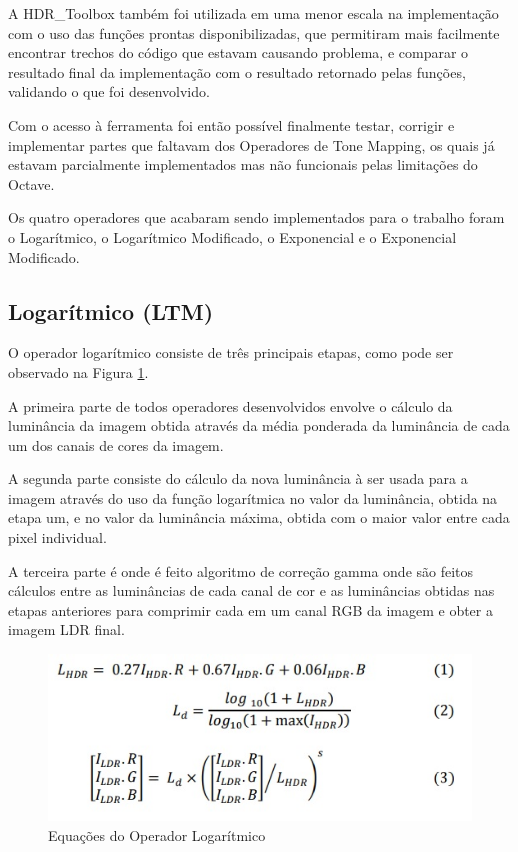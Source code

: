 \documentclass[conference]{IEEEtran}
\begin{document}
A HDR\_Toolbox também foi utilizada em uma menor escala na implementação com o uso das funções prontas disponibilizadas, que permitiram mais facilmente encontrar trechos do código que estavam causando problema, e comparar o resultado final da implementação com o resultado retornado pelas funções, validando o que foi desenvolvido.

Com o acesso à ferramenta foi então possível finalmente testar, corrigir e implementar partes que faltavam dos Operadores de Tone Mapping, os quais já estavam parcialmente implementados mas não funcionais pelas limitações do Octave.

Os quatro operadores que acabaram sendo implementados para o trabalho foram o Logarítmico, o Logarítmico Modificado, o Exponencial e o Exponencial Modificado.

\subsection{Logarítmico (LTM)}

O operador logarítmico consiste de três principais etapas, como pode ser observado na Figura \ref{LTM}.

A primeira parte de todos operadores desenvolvidos envolve o cálculo da luminância da imagem obtida através da média ponderada da luminância de cada um dos canais de cores da imagem.

A segunda parte consiste do cálculo da nova luminância à ser usada para a imagem através do uso da função logarítmica no valor da luminância, obtida na etapa um, e no valor da luminância máxima, obtida com o maior valor entre cada pixel individual.

A terceira parte é onde é feito algoritmo de correção gamma onde são feitos cálculos entre as luminâncias de cada canal de cor e as luminâncias obtidas nas etapas anteriores para comprimir cada em um canal RGB da imagem e obter a imagem LDR final.

\begin{figure}[!htpb]
    \centering
    \includegraphics[scale=.40]{Imagens/log.jpg}
    \caption{Equações do Operador Logarítmico}
    \label{LTM}
\end{figure}
\end{document}
